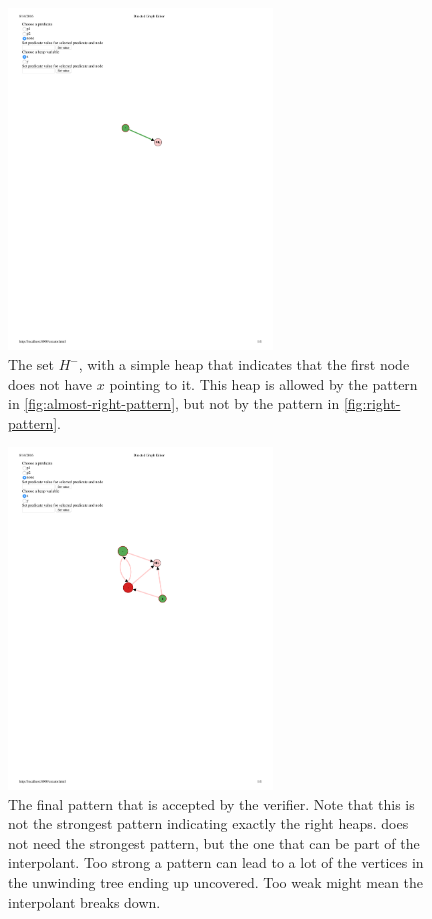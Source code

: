 \begin{figure}
  \centering
  \includegraphics[width=7cm]{fig/negative1.pdf}
  \caption{The set $H^{-}$, with a simple heap that indicates that the first node does not have $x$ pointing to it. This heap is allowed by the pattern in \autoref{fig:almost-right-pattern}, but not by the pattern in \autoref{fig:right-pattern}.}
  \label{fig:negative-example}
\end{figure}

\begin{figure}
  \centering
  \includegraphics[width=7cm]{fig/candidate6.pdf}
  \caption{The final pattern that is accepted by the verifier. Note that this is not the strongest pattern indicating exactly the right heaps. \verifier does not need the strongest pattern, but the one that can be part of the interpolant. Too strong a pattern can lead to a lot of the vertices in the unwinding tree ending up uncovered. Too weak might mean the interpolant breaks down.}
  \label{fig:right-pattern}
\end{figure}

